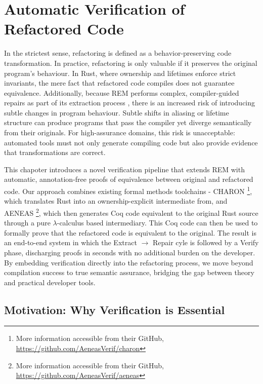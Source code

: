 \chapter{Automatic Verification of Refactored Code}
\label{chap:verification}



In the strictest sense, refactoring is defined as a behavior-preserving code
transformation. In practice, refactoring is only valuable if it preserves the
original program's behaviour. In Rust, where ownership and lifetimes enforce
strict invariants, the mere fact that refactored code compiles does not
guarantee equivalence. Additionally, because REM performs complex,
compiler-guided repairs as part of its extraction process
\cite{AdventureOfALifetime}, there is an increased risk of introducing subtle
changes in program behaviour. Subtle shifts in aliasing or lifetime structure
can produce programs that pass the compiler yet diverge semantically from their
originals. For high-assurance domains, this risk is unacceptable: automated
tools must not only generate compiling code but also provide evidence that
transformations are correct.

This chapoter introduces a novel verification pipeline that extends REM with
automatic, annotation-free proofs of equivalence between original and refactored
code. Our approach combines existing formal methods toolchains - CHARON
\footnote{More information accessible from their GitHub, \url{https://github.com/AeneasVerif/charon}}, which
translates Rust into an ownership-explicit intermediate from, and AENEAS
\footnote{More information accessible from their GitHub, \url{https://github.com/AeneasVerif/aeneas}}, which
then generates Coq code equivalent to the original Rust source through a pure
$\lambda$-calculus based intermediary. This Coq code can then be used
to formally prove that the refactored code is equivalent to the original.
The result is an end-to-end system in which the Extract $\rightarrow$ Repair
cyle is followed by a Verify phase, discharging proofs in seconds with no
additional burden on the developer. By embedding verification directly into the
refactoring process, we move beyond compilation success to true semantic
assurance, bridging the gap between theory and practical developer tools.

\section{Motivation: Why Verification is Essential}
\label{sec:motivation_verification}

